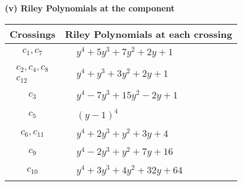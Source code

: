 \documentclass[1p]{elsarticle_modified}
\theoremstyle{definition}
\begin{document}
\newpage\renewcommand{\arraystretch}{1}
\flushleft \textbf{(v) Riley Polynomials at the component}\newline \\
\begin{tabular}{m{50pt}|m{274pt}}
Crossings & \hspace{64pt}Riley Polynomials at each crossing \\
\hline $$\begin{aligned}c_{1},c_{7}\end{aligned}$$&$\begin{aligned}
&y^4+5 y^3+7 y^2+2 y+1
\end{aligned}$\\
\hline $$\begin{aligned}c_{2},c_{4},c_{8}\\c_{12}\end{aligned}$$&$\begin{aligned}
&y^4+y^3+3 y^2+2 y+1
\end{aligned}$\\
\hline $$\begin{aligned}c_{3}\end{aligned}$$&$\begin{aligned}
&y^4-7 y^3+15 y^2-2 y+1
\end{aligned}$\\
\hline $$\begin{aligned}c_{5}\end{aligned}$$&$\begin{aligned}
&(y-1)^4
\end{aligned}$\\
\hline $$\begin{aligned}c_{6},c_{11}\end{aligned}$$&$\begin{aligned}
&y^4+2 y^3+y^2+3 y+4
\end{aligned}$\\
\hline $$\begin{aligned}c_{9}\end{aligned}$$&$\begin{aligned}
&y^4-2 y^3+y^2+7 y+16
\end{aligned}$\\
\hline $$\begin{aligned}c_{10}\end{aligned}$$&$\begin{aligned}
&y^4+3 y^3+4 y^2+32 y+64
\end{aligned}$\\
\hline
\end{tabular}\\~\\
\end{document}
